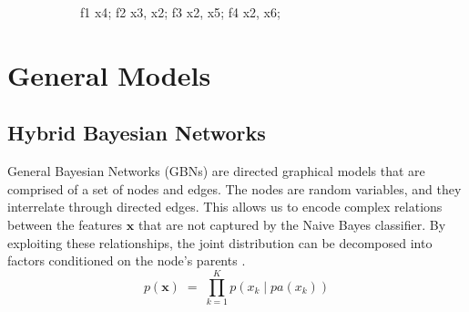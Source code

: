 \documentclass{article}
\begin{document}
\begin{figure}
\begin{subfigure}[t]{0.45\textwidth}
{{           {f1} {x4}; %
           {f2} {x3, x2}; %
           {f3} {x2, x5}; %
           {f4} {x2, x6}; %
        }}
    \end{subfigure}
\end{figure}

\section{General Models}
\label{sec:general-models}
\subsection{Hybrid Bayesian Networks}
\label{sec:BN}
General Bayesian Networks (GBNs) are directed graphical models that are
comprised of a set of nodes and edges. The nodes are random variables,
and they interrelate through directed edges. This allows us to
encode complex relations between the features $\mathbf{x}$ that are not
captured by the Naive Bayes classifier. By exploiting these relationships,
the joint distribution can be decomposed into factors conditioned on the node's
parents \cite{murphy}.
\begin{equation}
  p(\mathbf{x}) \; = \; \prod_{k=1}^K p(x_k \mid pa(x_k))
\end{equation}
\end{document}
